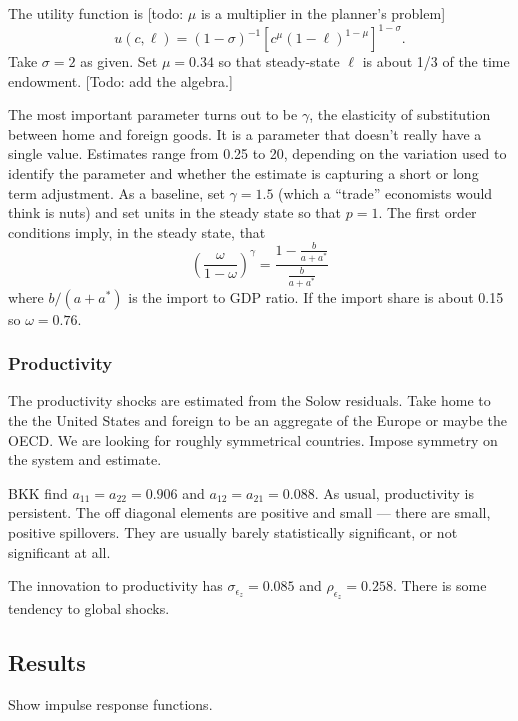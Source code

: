 \documentclass[11pt,pdftex,twoside,letterpaper]{exam}
\begin{document}
The utility function is [todo: $\mu$ is a multiplier in the planner's problem]
\begin{equation}\label{eq:standard-prefs}
  u(c,\ell) = (1-\sigma)^{-1}\left[ c^\mu (1-\ell)^{1-\mu} \right]^{1-\sigma}.
\end{equation}
Take $\sigma=2$ as given. Set $\mu=0.34$ so that steady-state $\ell$ is about 1/3 of the time endowment. [Todo: add the algebra.]

The most important parameter turns out to be $\gamma$, the elasticity of substitution between home and foreign goods. It is a parameter that doesn't really have a single value. Estimates range from 0.25 to 20, depending on the variation used to identify the parameter and whether the estimate is capturing a short or long term adjustment. As a baseline, set $\gamma=1.5$ (which a ``trade'' economists would think is nuts) and set units in the steady state so that $p=1$. The first order conditions imply, in the steady state, that
\begin{equation}\label{}
  \left(\frac{\omega}{1-\omega}\right)^\gamma=\frac{1-\frac{b}{a+a^*}}{\frac{b}{a+a^*}}
\end{equation}
where $b/(a+a^*)$ is the import to GDP ratio. If the import share is about 0.15 so $\omega=0.76$.

\subsubsection*{Productivity}
The productivity shocks are estimated from the Solow residuals. Take home to the the United States and foreign to be an aggregate of the Europe or maybe the OECD. We are looking for roughly symmetrical countries. Impose symmetry on the system and estimate.

BKK find $a_{11}=a_{22}=0.906$ and $a_{12}=a_{21}=0.088$. As usual, productivity is persistent. The off diagonal elements are positive and small --- there are small, positive spillovers. They are usually barely statistically significant, or not significant at all.

The innovation to productivity has $\sigma_{\epsilon_z}=0.085$ and $\rho_{\epsilon_z}=0.258$. There is some tendency to global shocks.

\subsection{Results}
Show impulse response functions.
\end{document}
